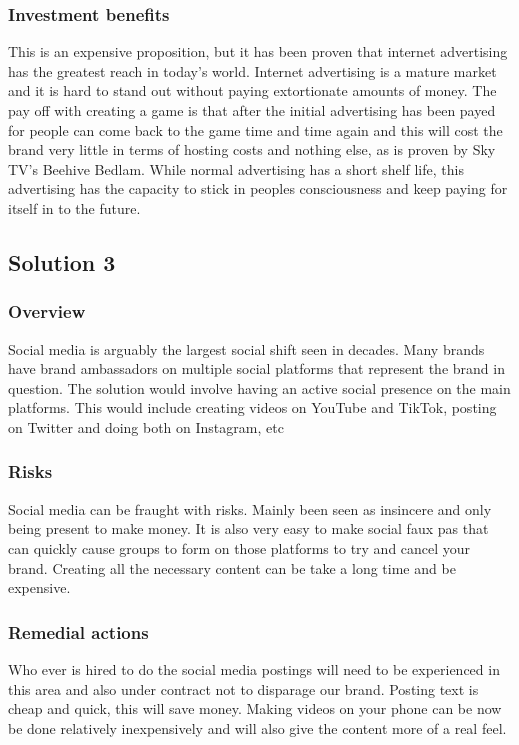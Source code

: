 \documentclass{article}
\begin{document}
\subsubsection{Investment benefits}
This is an expensive proposition, but it has been proven that internet advertising has the greatest reach in today's world. Internet advertising is a mature market and it is hard to stand out without paying extortionate amounts of money. The pay off with creating a game is that after the initial advertising has been payed for people can come back to the game time and time again and this will cost the brand very little in terms of hosting costs and nothing else, as is proven by Sky TV's Beehive Bedlam.
While normal advertising has a short shelf life, this advertising has the capacity to stick in peoples consciousness and keep paying for itself in to the future.

\subsection{Solution 3}
\subsubsection{Overview}
Social media is arguably the largest social shift seen in decades. Many brands have brand ambassadors on multiple social platforms that represent the brand in question. The solution would involve having an active social presence on the main platforms. This would include creating videos on YouTube and TikTok, posting on Twitter and doing both on Instagram, etc

\subsubsection{Risks}
Social media can be fraught with risks. Mainly been seen as insincere and only being present to make money. It is also very easy to make social faux pas that can quickly cause groups to form on those platforms to try and cancel your brand.
Creating all the necessary content can be take a long time and be expensive.

\subsubsection{Remedial actions}
Who ever is hired to do the social media postings will need to be experienced in this area and also under contract not to disparage our brand.
Posting text is cheap and quick, this will save money. Making videos on your phone can be now be done relatively inexpensively and will also give the content more of a real feel.
\end{document}
